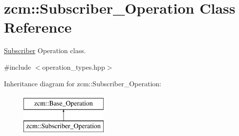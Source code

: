 \hypertarget{classzcm_1_1Subscriber__Operation}{\section{zcm\-:\-:Subscriber\-\_\-\-Operation Class Reference}
\label{classzcm_1_1Subscriber__Operation}
}


\hyperlink{classzcm_1_1Subscriber}{Subscriber} Operation class.  




{\ttfamily \#include $<$operation\-\_\-types.\-hpp$>$}

Inheritance diagram for zcm\-:\-:Subscriber\-\_\-\-Operation\-:\begin{figure}[H]
\begin{center}
\leavevmode
\includegraphics[height=2.000000cm]{classzcm_1_1Subscriber__Operation}
\end{center}
\end{figure}
